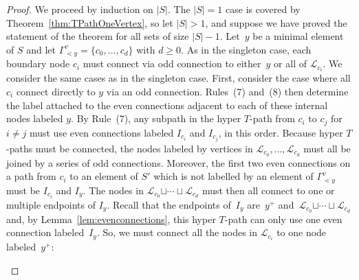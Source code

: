 \documentclass[10pt,a4paper]{amsart}
\numberwithin{equation}{section}
\newcommand{\new}[1]{{#1}}
\begin{document}
\begin{proof}
We proceed by induction on $\vert S \vert$. The $\vert S \vert = 1$ case is covered by Theorem~\ref{thm:TPathOneVertex}, so let $\vert S \vert > 1$, and suppose we have proved the statement of the theorem for all sets of size $\vert S \vert-1$. Let~$y$ be a minimal element of $S$ and let $\Gamma_{\lessdot y}^v = \{c_0,\ldots,c_d\}$ with $d \geq 0$. As in the singleton case, each boundary node $c_i$ must connect via odd connection to either~$y$ or all of $\mathcal{L}_{c_i}$. We consider the same cases as in the singleton case.
First, consider the case where all $c_i$ connect directly to $y$ via an odd connection. Rules~(7) and~(8) then determine the label attached to the even connections adjacent to each of these internal nodes labeled $y$. By Rule~(7), any subpath in the hyper $T$-path from $c_i$ to $c_j$ for $i \neq j$ must use even connections labeled $I_{c_i}$ and $I_{c_j}$, in this order. Because hyper $T$-paths must be connected, the nodes labeled by vertices in $\mathcal{L}_{c_0}, \dots, \mathcal{L}_{c_d}$ must all be joined by a series of odd connections. Moreover, the first two even connections on a path from $c_i$ to an element of $S'$ which is not labelled by an element of $\Gamma_{\lessdot y}^v$ must be $I_{c_i}$ and $I_y$. The nodes in $\mathcal{L}_{c_0} \new{\sqcup \cdots \sqcup} \mathcal{L}_{c_d}$ must then all connect to one or multiple endpoints of $I_y$. Recall that the endpoints of~$I_y$ are~$y^+$ and~$\mathcal{L}_{c_0} \new{\sqcup \cdots \sqcup} \mathcal{L}_{c_d}$ and, by Lemma~\ref{lem:evenconnections}, this hyper $T$-path can only use one even connection labeled~$I_y$. So, we must connect all the nodes in $\mathcal{L}_{c_i}$ to one node labeled~$y^+$:
\begin{center}
\end{center}
\end{proof}
\end{document}
